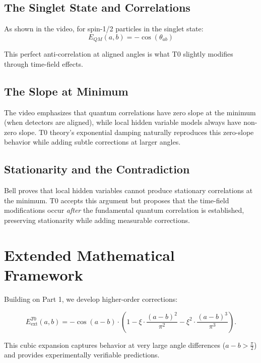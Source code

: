 \subsection{The Singlet State and Correlations}

As shown in the video, for spin-1/2 particles in the singlet state:
\begin{equation}
E_{QM}(a,b) = -\cos(\theta_{ab})
\end{equation}

This perfect anti-correlation at aligned angles is what T0 slightly modifies through time-field effects.

\subsection{The Slope at Minimum}

The video emphasizes that quantum correlations have zero slope at the minimum (when detectors are aligned), while local hidden variable models always have non-zero slope. T0 theory's exponential damping naturally reproduces this zero-slope behavior while adding subtle corrections at larger angles.

\subsection{Stationarity and the Contradiction}

Bell proves that local hidden variables cannot produce stationary correlations at the minimum. T0 accepts this argument but proposes that the time-field modifications occur \textit{after} the fundamental quantum correlation is established, preserving stationarity while adding measurable corrections.

\section{Extended Mathematical Framework}
\label{sec:extended_math}

Building on Part 1, we develop higher-order corrections:

\begin{equation}
E^{T0}_{\text{ext}}(a,b) = -\cos(a-b) \cdot \left(1 - \xi \cdot \frac{(a-b)^2}{\pi^2} - \xi^2 \cdot \frac{(a-b)^3}{\pi^3}\right).
\label{eq:cubic_expansion}
\end{equation}

This cubic expansion captures behavior at very large angle differences ($a-b > \frac{\pi}{2}$) and provides experimentally verifiable predictions.

